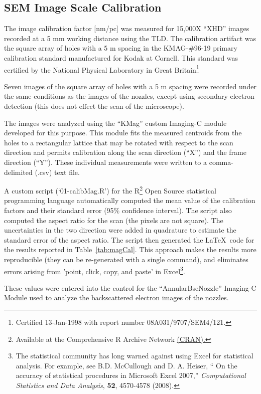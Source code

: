 \subsection{SEM Image Scale Calibration}

The image calibration factor [nm/pc] was measured for 15,000X
``XHD'' images recorded at a 5 mm working distance using the TLD.
The calibration artifact was the square array of holes with a 5
\textmu m spacing in the KMAG-\#96-19 primary calibration standard
manufactured for Kodak at Cornell. This standard was certified
by the National Physical Laboratory in Great
Britain\footnote{Certified 13-Jan-1998
with report number 08A031/9707/SEM4/121.}

Seven images of the square array of holes with a 5
\textmu m spacing were recorded under the same conditions
as the images of the nozzles, except using secondary electron
detection (this does not effect the scan of the microscope).

The images were analyzed using the ``KMag'' custom
Imaging-C module developed for this purpose. This module fits
the measured centroids from the holes to a rectangular lattice
that may be rotated with respect to the scan direction and permits
calibration along the scan direction (``X'') and the frame
direction (``Y''). These individual measurements were written
to a comma-delimited (.csv) text file.

A custom script (`01-calibMag.R') for the R\footnote{Available
at the Comprehensive R Archive Network \href{http://cran.r-project.org/}
{(CRAN).}} Open Source
statistical programming language automatically computed the
mean value of the calibration factors and their standard error
(95\% confidence interval). The
script also computed the aspect ratio for the scan (the pixels are
not square). The uncertainties in the two direction were added in
quadrature to estimate the standard error of the aspect ratio.
The script then generated the \LaTeX\ code for the results reported
in Table~\ref{tab:magCal}. This approach makes the results more
reproducible (they can be re-generated with a single command),
and eliminates errors arising from 'point, click, copy, and paste'
in Excel\footnote{The statistical community has long warned against
using Excel for statistical analysis. For example, see B.D. McCullough
and D. A. Heiser, `` On the accuracy of statistical procedures in
Microsoft Excel 2007,'' \emph{Computational Statistics and Data
Analysis}, \textbf{52}, 4570-4578 (2008).}.


These values were entered into the
control for the ``AnnularBseNozzle'' Imaging-C Module used to
analyze the backscattered electron images of the nozzles.


\endinput

